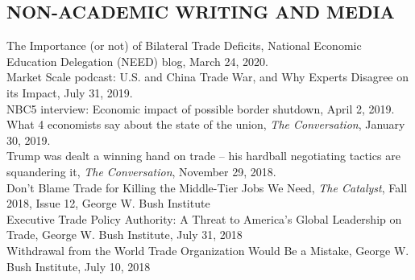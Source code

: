 \documentclass[11pt]{res}
\begin{document}
\begin{resume}
\section{NON-ACADEMIC WRITING AND MEDIA}\vspace{1.5mm}
The Importance (or not) of Bilateral Trade Deficits, National Economic Education Delegation (NEED) blog, March 24, 2020.\vspace{1.5mm}\\
Market Scale podcast: U.S. and China Trade War, and Why Experts Disagree on its Impact, July 31, 2019.\vspace{1.5mm}\\
NBC5 interview: Economic impact of possible border shutdown, April 2, 2019.\vspace{1.5mm}\\
What 4 economists say about the state of the union, \emph{The Conversation}, January 30, 2019.\vspace{1.5mm}\\
Trump was dealt a winning hand on trade – his hardball negotiating tactics are squandering it, \emph{The Conversation}, November 29, 2018.\vspace{1.5mm}\\
Don't Blame Trade for Killing the Middle-Tier Jobs We Need, \emph{The Catalyst}, Fall 2018, Issue 12, George W. Bush Institute\vspace{1.5mm}\\
Executive Trade Policy Authority: A Threat to America’s Global Leadership on Trade, George W. Bush Institute, July 31, 2018\vspace{1.5mm}\\
Withdrawal from the World Trade Organization Would Be a Mistake, George W. Bush Institute, July 10, 2018






\end{resume}
\end{document}
